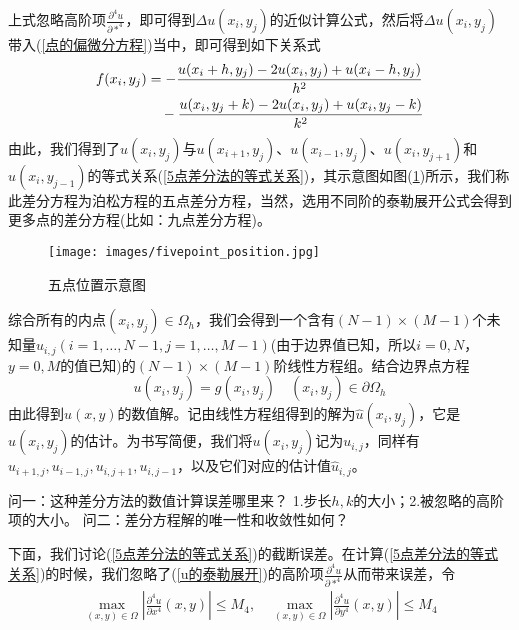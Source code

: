             上式忽略高阶项$\frac{\partial^4 u}{\partial *^4}$，即可得到$\Delta u(x_i,y_j)$的近似计算公式，然后将$\Delta u(x_i,y_j)$带入(\ref{点的偏微分方程})当中，即可得到如下关系式
            \begin{align}
            \label{5点差分法的等式关系}
                f(x_i,y_j) &= - \frac{u(x_i+h,y_j) - 2u(x_i,y_j)+u(x_i-h, y_j)}{h^2} \notag\\
                &\quad - \frac{u(x_i,y_j + k) - 2u(x_i,y_j)+u(x_i, y_j - k)}{k^2}
            \end{align}
            由此，我们得到了$u(x_i,y_j)$与$u(x_{i+1},y_j)$、$u(x_{i-1},y_j)$、$u(x_i,y_{j+1})$和$u(x_i,y_{j-1})$的等式关系(\ref{5点差分法的等式关系})，其示意图如图(\ref{fig:五点位置示意图})所示，我们称此差分方程为泊松方程的五点差分方程，当然，选用不同阶的泰勒展开公式会得到更多点的差分方程(比如：九点差分方程)。
		\begin{figure}[H]
		\centering
		\texttt{[image: images/fivepoint\_position.jpg]}
		\caption{五点位置示意图}
		\label{fig:五点位置示意图}
		\end{figure}
            \par
            综合所有的内点$(x_i,y_j) \in \Omega_h$，我们会得到一个含有$(N-1)\times (M-1)$个未知量$u_{i,j}(i = 1,\dots,N-1,j = 1,\dots,M-1)$(由于边界值已知，所以$i = 0,N$，$y = 0,M$的值已知)的$(N-1)\times (M-1)$阶线性方程组。结合边界点方程
            \[
                u(x_i,y_j) = g(x_i,y_j) \quad (x_i,y_j) \in \partial \Omega_h
            \]
            由此得到$u(x,y)$的数值解。记由线性方程组得到的解为$\hat{u}(x_i,y_j)$，它是$u(x_i,y_j)$的估计。为书写简便，我们将$u(x_i,y_j)$记为$u_{i,j}$，同样有$u_{i+1,j},u_{i-1,j},u_{i,j+1},u_{i,j-1}$，以及它们对应的估计值$\hat{u}_{i,j}$。
            \par
            问一：这种差分方法的数值计算误差哪里来？
            1.步长$h,k$的大小；2.被忽略的高阶项的大小。
            问二：差分方程解的唯一性和收敛性如何？
            \par
            下面，我们讨论(\ref{5点差分法的等式关系})的截断误差。在计算(\ref{5点差分法的等式关系})的时候，我们忽略了(\ref{u的泰勒展开})的高阶项$\frac{\partial^4 u}{\partial *^4}$从而带来误差，令
            \begin{align*}
                \max_{(x,y) \in \Omega} \left| \frac{\partial^4 u}{\partial x^4}(x,y) \right| \leqslant M_4,\quad
                \max_{(x,y) \in \Omega} \left| \frac{\partial^4 u}{\partial y^4}(x,y) \right| \leqslant M_4
            \end{align*}
